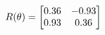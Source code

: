\documentclass[preview]{standalone}
\begin{document}
\begin{align*}
\special{dvisvgm:raw <g id='unique000'>}R(\theta) = \begin{bmatrix}0.36 & -0.93\\0.93 & 0.36\end{bmatrix}\special{dvisvgm:raw </g>}
\end{align*}
\end{document}
